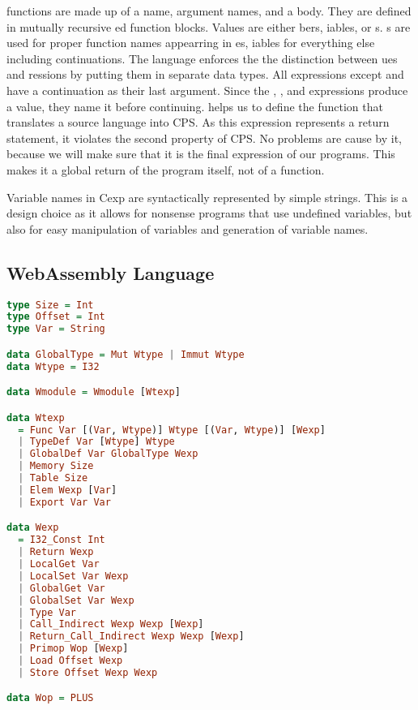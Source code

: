 { functions are made up of a name, argument names, and a body. They are defined in mutually recursive ed function blocks. Values are either bers, iables, or s. s are used for proper function names appearring in es, iables for everything else including continuations. The  language enforces the the distinction between ues and ressions by putting them in separate data types. All expressions except  and  have a continuation as their last argument. Since the , , and  expressions produce a value, they name it before continuing.  helps us to define the function that translates a source language into \ac{CPS}. As this expression represents a return statement, it violates the second property of \ac{CPS}. No problems are cause by it, because we will make sure that it is the final expression of our programs. This makes it a global return of the program itself, not of a function.

Variable names in \ac{Cexp} are syntactically represented by simple strings. This is a design choice as it allows for nonsense programs that use undefined variables, but also for easy manipulation of variables and generation of variable names.

\subsection{\label{subsection:webdata}WebAssembly Language}
\begin{lstlisting}[language=Haskell]
type Size = Int
type Offset = Int
type Var = String

data GlobalType = Mut Wtype | Immut Wtype
data Wtype = I32

data Wmodule = Wmodule [Wtexp]

data Wtexp
  = Func Var [(Var, Wtype)] Wtype [(Var, Wtype)] [Wexp]
  | TypeDef Var [Wtype] Wtype
  | GlobalDef Var GlobalType Wexp
  | Memory Size
  | Table Size
  | Elem Wexp [Var]
  | Export Var Var

data Wexp
  = I32_Const Int
  | Return Wexp
  | LocalGet Var
  | LocalSet Var Wexp
  | GlobalGet Var
  | GlobalSet Var Wexp
  | Type Var
  | Call_Indirect Wexp Wexp [Wexp]
  | Return_Call_Indirect Wexp Wexp [Wexp]
  | Primop Wop [Wexp]
  | Load Offset Wexp
  | Store Offset Wexp Wexp

data Wop = PLUS
\end{lstlisting}

}
